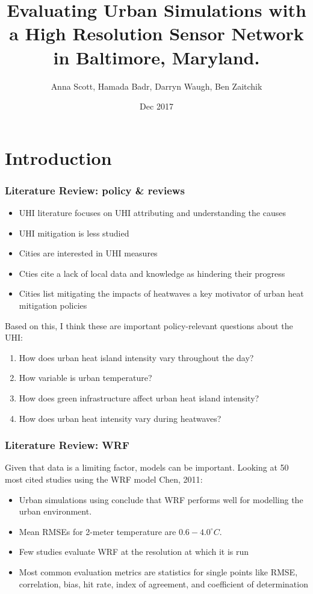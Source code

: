\documentclass[aspectratio=169, 10pt]{beamer}
\title{Evaluating Urban Simulations with a High Resolution Sensor Network in Baltimore, Maryland.}
\subtitle{}
\date{Dec 2017}
\author{Anna Scott, Hamada Badr, Darryn Waugh, Ben Zaitchik}
\institute{annascott@jhu.edu }
\begin{document}
\maketitle



\section{Introduction}

\begin{frame}
\frametitle{Literature Review: policy \& reviews}
\begin{itemize}
\item UHI literature focuses on UHI attributing and understanding the causes \item UHI mitigation is less studied 
\item Cities are interested in UHI measures
\item Cties cite a lack of local data and knowledge as hindering their progress %
\item Cities list mitigating the impacts of heatwaves a key motivator of urban heat mitigation policies %
\end{itemize}
\end{frame}

\begin{frame}
Based on this, I think these are important policy-relevant questions about the UHI:  
\begin{enumerate}
\item How does urban heat island intensity vary throughout the day? 
\item How variable is urban temperature? 
\item How does green infrastructure affect urban heat island intensity? 
\item How does urban heat intensity vary during heatwaves? 
\end{enumerate}
\end{frame}

\begin{frame}[label=intro]
\frametitle{Literature Review: WRF}
\centering
Given that data is a limiting factor, models can be important. Looking at 50 most cited studies using  the WRF model \tiny{Chen, 2011}: 
\begin{itemize}
\item Urban simulations using conclude that WRF performs well for modelling the urban environment. 

\item Mean RMSEs for 2-meter temperature are $0.6-4.0^\circ C$.
 
\item Few studies evaluate WRF at the resolution at which it is run 

\item Most common evaluation metrics are statistics for single points like RMSE, correlation, bias, hit rate, index of agreement, and coefficient of determination
\end{itemize}

\end{frame}
\end{document}
